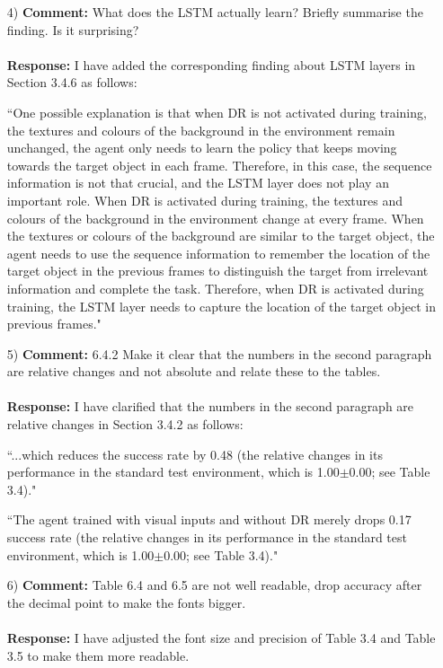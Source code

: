 \documentclass[11pt]{article}
\begin{document}
\begin{enumerate}
\item[4)] \textbf{Comment:} What does the LSTM actually learn? Briefly summarise the finding. Is it surprising?\\ \\
\textbf{Response:} I have added the corresponding finding about LSTM layers in Section 3.4.6 as follows:

``One possible explanation is that when DR is not activated during training, the textures and colours of the background in the environment remain unchanged, the agent only needs to learn the policy that keeps moving towards the target object in each frame. Therefore, in this case, the sequence information is not that crucial, and the LSTM layer does not play an important role. When DR is activated during training, the textures and colours of the background in the environment change at every frame. When the textures or colours of the background are similar to the target object, the agent needs to use the sequence information to remember the location of the target object in the previous frames to distinguish the target from irrelevant information and complete the task. Therefore, when DR is activated during training, the LSTM layer needs to capture the location of the target object in previous frames."

\item[5)] \textbf{Comment:} 6.4.2 Make it clear that the numbers in the second paragraph are relative changes and not absolute and relate these to the tables.\\ \\
\textbf{Response:} I have clarified that the numbers in the second paragraph are relative changes in Section 3.4.2 as follows:

``...which reduces the success rate by 0.48 (the relative changes in its performance in the standard test environment, which is 1.00$\pm$0.00; see Table 3.4)."

``The agent trained with visual inputs and without DR merely drops 0.17 success rate (the relative changes in its performance in the standard test environment, which is 1.00$\pm$0.00; see Table 3.4)."

\item[6)] \textbf{Comment:} Table 6.4 and 6.5 are not well readable, drop accuracy after the decimal point to make the fonts bigger.\\ \\
\textbf{Response:} I have adjusted the font size and precision of Table 3.4 and Table 3.5  to make them more readable.

\end{enumerate}
\end{document}
